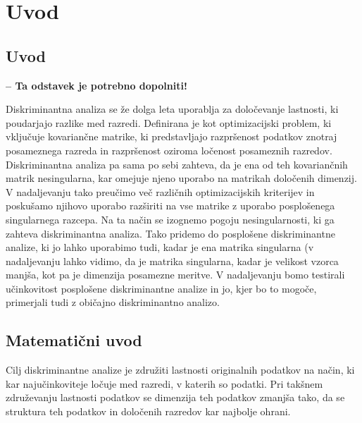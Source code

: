 \documentclass[mat1]{article}
\begin{document}
\section{Uvod}

\subsection{Uvod}

\textbf{-- Ta odstavek je potrebno dopolniti!}

Diskriminantna analiza se že dolga leta uporablja za določevanje lastnosti, ki poudarjajo razlike med razredi. Definirana je kot optimizacijski problem, ki vključuje kovariančne matrike, ki predstavljajo razpršenost podatkov znotraj posameznega razreda in razpršenost oziroma ločenost posameznih razredov. Diskriminantna analiza pa sama po sebi zahteva, da je ena od teh kovariančnih matrik nesingularna, kar omejuje njeno uporabo na matrikah določenih dimenzij. V nadaljevanju tako preučimo več različnih optimizacijskih kriterijev in poskušamo njihovo uporabo razširiti na vse matrike z uporabo posplošenega singularnega razcepa. Na ta način se izognemo pogoju nesingularnosti, ki ga zahteva diskriminantna analiza. Tako pridemo do posplošene diskriminantne analize, ki jo lahko uporabimo tudi, kadar je ena matrika singularna (v nadaljevanju lahko vidimo, da je matrika singularna, kadar je velikost vzorca manjša, kot pa je dimenzija posamezne meritve. V nadaljevanju bomo testirali učinkovitost posplošene diskriminantne analize in jo, kjer bo to mogoče, primerjali tudi z običajno diskriminantno analizo.

\subsection{Matematični uvod}

Cilj diskriminantne analize je združiti lastnosti originalnih podatkov na način, ki kar najučinkoviteje ločuje med razredi, v katerih so podatki. Pri takšnem združevanju lastnosti podatkov se dimenzija teh podatkov zmanjša tako, da se struktura teh podatkov in določenih razredov kar najbolje ohrani.
\end{document}
